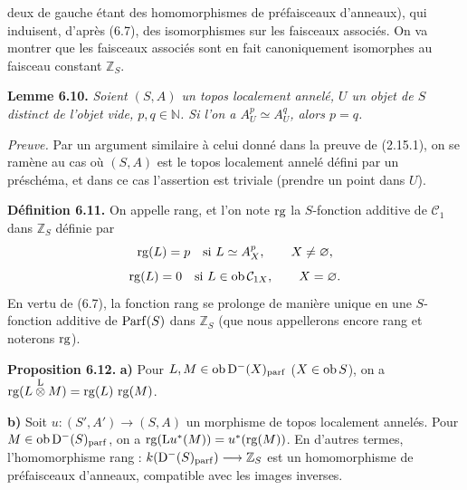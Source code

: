 deux de gauche étant des homomorphismes de préfaisceaux d'anneaux), qui induisent, d'après (6.7), des isomorphismes sur les faisceaux associés. On va montrer que les faisceaux associés sont en fait canoniquement isomorphes au faisceau constant \(\mathbb Z_S\).

\textbf{Lemme 6.10.} \emph{Soient \((S,A)\) un topos localement annelé, \(U\) un objet de \(S\) distinct de l'objet vide, \(p,q\in\mathbb N\). Si l'on a \(A_U^p\simeq A_U^q\), alors \(p=q\).}

\emph{Preuve.} Par un argument similaire à celui donné dans la preuve de (2.15.1), on se ramène au cas où \((S,A)\) est le topos localement annelé défini par un préschéma, et dans ce cas l'assertion est triviale (prendre un point dans \(U\)).

\textbf{Définition 6.11.} On appelle rang, et l'on note \(\operatorname{rg}\) la \(S\)-fonction additive de \(\mathcal C_1\) dans \(\mathbb Z_S\) définie par
\[
  \operatorname{rg}(L)=p\quad\text{si } L\simeq A_X^p,
  \qquad X\ne\varnothing,
\]
\[
  \operatorname{rg}(L)=0\quad\text{si } L\in\operatorname{ob}\mathcal C_{1X},
  \qquad X=\varnothing.
\]
En vertu de (6.7), la fonction rang se prolonge de manière unique en une \(S\)-fonction additive de \(\operatorname{Parf}(S)\) dans \(\mathbb Z_S\) (que nous appellerons encore rang et noterons \(\operatorname{rg}\)).

\textbf{Proposition 6.12.} \textbf{a)} Pour \(L,M\in\operatorname{ob}\mathrm D^-(X)_{\mathrm{parf}}\) (\(X\in\operatorname{ob} S\)), on a \(\operatorname{rg}(L\overset{\mathrm L}{\otimes} M)=\operatorname{rg}(L)\,\operatorname{rg}(M)\).

\textbf{b)} Soit \(u:(S',A')\longrightarrow(S,A)\) un morphisme de topos localement annelés. Pour \(M\in\operatorname{ob}\mathrm D^-(S)_{\mathrm{parf}}\), on a \(\operatorname{rg}(\mathrm L u^*(M))=u^*(\operatorname{rg}(M))\). En d'autres termes, l'homomorphisme rang : \(k(\mathrm D^-(S)_{\mathrm{parf}})\longrightarrow \mathbb Z_S\) est un homomorphisme de préfaisceaux d'anneaux, compatible avec les images inverses.



